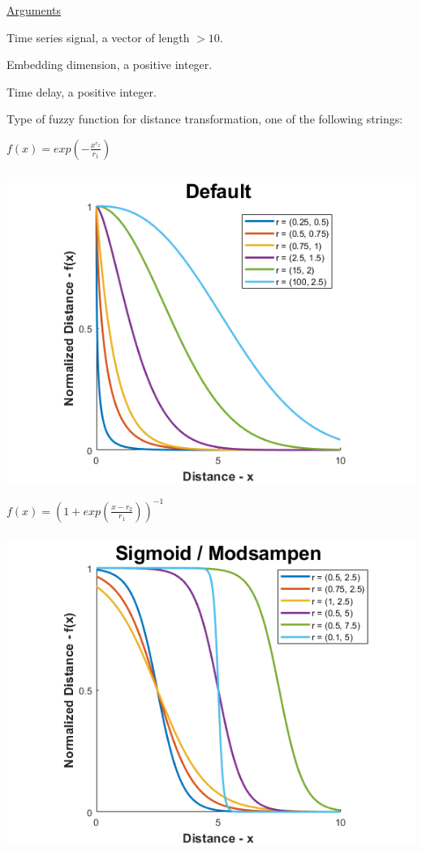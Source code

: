 \documentclass[12pt, a4paper, titlepage, openany]{book}
\begin{document}
\noindent \ul{Arguments}
\begin{description}[labelsep=1cm, labelwidth=2cm, nosep,style=multiline,leftmargin=3cm]\footnotesize
\item[\texttt{Sig}]		Time series signal, a vector of length $> 10$.
\item[\texttt{m}]		Embedding dimension, a positive integer.
\item[\texttt{tau}]		Time delay, a positive integer.
\item[\texttt{Fx}]		Type of fuzzy function for distance transformation, one of the following strings:
	\begin{description}[labelsep=14em, labelwidth=10em, nosep,style=multiline,leftmargin=6cm]
	\item[\texttt{"default"}]	$f(x) = exp(-\frac{x^{r_2}}{r_1})$\\ \ \\
		\includegraphics[scale=.5]{Fuzz1v1.png} \\
		 
	\item[\texttt{"sigmoid"/"modsampen"}]	$f(x) = (1+exp(\frac{x-r_2}{r_1}))^{-1}$\\ \ \\
		\includegraphics[scale=.5]{Fuzz2v1.png} \\


\end{description}
\end{description}
\end{document}

